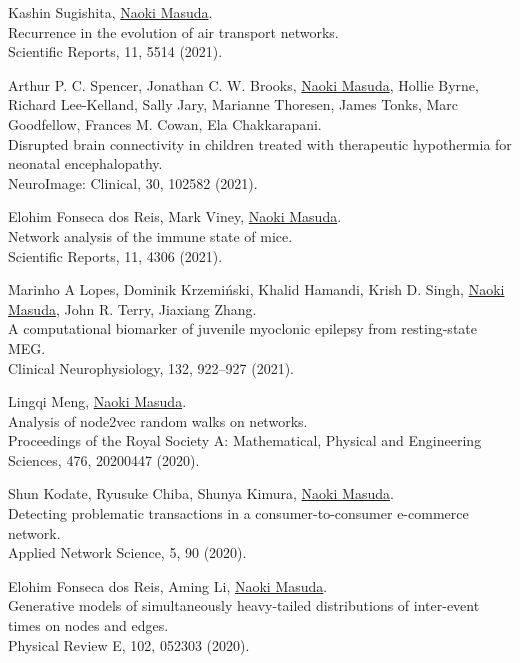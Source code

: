 \documentclass[11pt,letter]{article}
\begin{document}
\begin{etaremune}
\item Kashin Sugishita, \underline{Naoki Masuda}.\\
Recurrence in the evolution of air transport networks.\\
Scientific Reports, 11, 5514 (2021).

\item Arthur P. C. Spencer, Jonathan C. W. Brooks, \underline{Naoki Masuda}, Hollie Byrne, Richard Lee-Kelland, Sally Jary, Marianne Thoresen, James Tonks, Marc Goodfellow, Frances M. Cowan, Ela Chakkarapani.\\
Disrupted brain connectivity in children treated with therapeutic hypothermia for neonatal encephalopathy.\\
NeuroImage: Clinical, 30, 102582 (2021).

\item Elohim Fonseca dos Reis, Mark Viney, \underline{Naoki Masuda}.\\
Network analysis of the immune state of mice.\\
Scientific Reports, 11, 4306 (2021).

\item Marinho A Lopes, Dominik Krzemi\'{n}ski, Khalid Hamandi, Krish D. Singh, \underline{Naoki Masuda}, John R. Terry, Jiaxiang Zhang.\\
A computational biomarker of juvenile myoclonic epilepsy from resting-state MEG.\\
Clinical Neurophysiology, 132, 922--927 (2021).

\item Lingqi Meng, \underline{Naoki Masuda}.\\
Analysis of node2vec random walks on networks.\\
Proceedings of the Royal Society A: Mathematical, Physical and Engineering Sciences, 476, 20200447 (2020).

\item Shun Kodate, Ryusuke Chiba, Shunya Kimura, \underline{Naoki Masuda}.\\
Detecting problematic transactions in a consumer-to-consumer e-commerce network.\\
Applied Network Science, 5, 90 (2020).

\item Elohim Fonseca dos Reis, Aming Li, \underline{Naoki Masuda}.\\
Generative models of simultaneously heavy-tailed distributions of inter-event times on nodes and edges.\\
Physical Review E, 102, 052303 (2020).


\end{etaremune}
\end{document}
